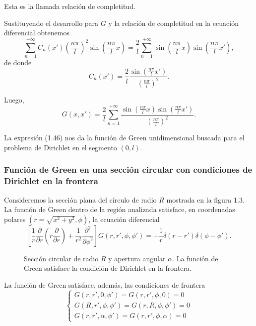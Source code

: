 \documentclass[12pt,a4paper]{book}
\begin{document}
Esta es la llamada relación de completitud.

Sustituyendo el desarrollo para $G$ y la relación de completitud en la ecuación diferencial obtenemos
\begin{equation}
\sum_{n=1}^{+\infty} C_n(x')\left(\frac{n\pi}{l}\right)^2 \sin\left(\frac{n\pi}{l}x\right) = \frac{2}{l}\sum_{n=1}^{+\infty} \sin\left(\frac{n\pi}{l}x\right) \sin\left(\frac{n\pi}{l}x'\right),
\end{equation}
de donde
\begin{equation}
C_n(x') = \frac{2}{l}\frac{\sin\left(\frac{n\pi}{l}x'\right)}{\left(\frac{n\pi}{l}\right)^2}.
\end{equation}

Luego,
\begin{equation}
G(x, x') = \frac{2}{l}\sum_{n=1}^{+\infty} \frac{\sin\left(\frac{n\pi}{l}x\right)\sin\left(\frac{n\pi}{l}x'\right)}{\left(\frac{n\pi}{l}\right)^2}.
\end{equation}

La expresión (1.46) nos da la función de Green unidimensional buscada para el problema de Dirichlet en el segmento $(0, l)$.

\subsubsection{Función de Green en una sección circular con condiciones de Dirichlet en la frontera}

Consideremos la sección plana del círculo de radio $R$ mostrada en la figura 1.3. La función de Green dentro de la región analizada satisface, en coordenadas polares $(r = \sqrt{x^2 + y^2}, \phi)$, la ecuación diferencial
\begin{equation}
\left[\frac{1}{r}\frac{\partial}{\partial r}\left(r\frac{\partial}{\partial r}\right) + \frac{1}{r^2}\frac{\partial^2}{\partial\phi^2}\right] G(r, r', \phi, \phi') = -\frac{1}{r}\delta(r - r')\delta(\phi - \phi').
\end{equation}

\begin{figure}
\centering
\caption{Sección circular de radio $R$ y apertura angular $\alpha$. La función de Green satisface la condición de Dirichlet en la frontera.}
\label{fig:1.3}
\end{figure}

La función de Green satisface, además, las condiciones de frontera
\begin{equation}
\begin{cases}
G(r, r', 0, \phi') = G(r, r', \phi, 0) = 0 \\
G(R, r', \phi, \phi') = G(r, R, \phi, \phi') = 0 \\
G(r, r', \alpha, \phi') = G(r, r', \phi, \alpha) = 0
\end{cases}
\end{equation}
\end{document}
